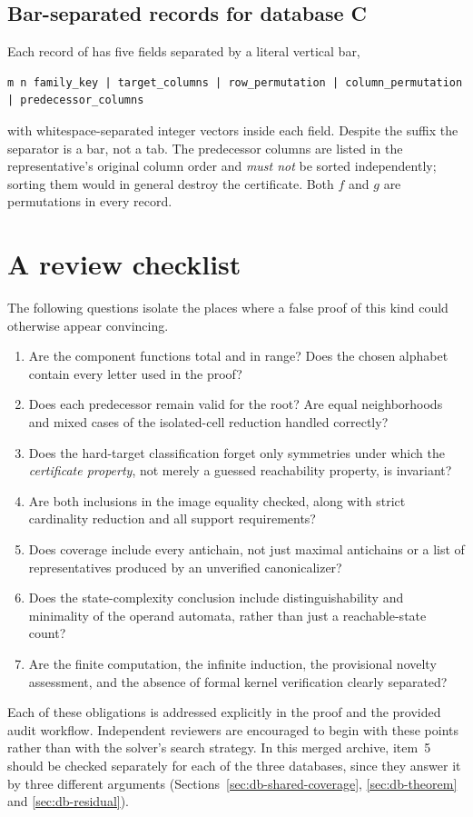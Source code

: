 \documentclass[11pt,letterpaper]{article}
\numberwithin{equation}{section}
\theoremstyle{definition}
\theoremstyle{remark}
\newcommand{\code}[1]{\texttt{\detokenize{#1}}}
\newcommand{\dbC}{\textsf{C}}
\begin{document}
\subsection{Bar-separated records for database \dbC{}}
Each record of  has five fields separated by
a literal vertical bar,
\begin{lstlisting}
m n family_key | target_columns | row_permutation | column_permutation | predecessor_columns
\end{lstlisting}
with whitespace-separated integer vectors inside each field. Despite the
\code{.tsv} suffix the separator is a bar, not a tab. The predecessor columns
are listed in the representative's original column order and
\emph{must not} be sorted independently; sorting them would in general
destroy the certificate. Both $f$ and $g$ are permutations in every record.

\section{A review checklist}
The following questions isolate the places where a false proof of this
kind could otherwise appear convincing.
{
\begin{enumerate}[label=\arabic*.]
\item Are the component functions total and in range? Does the chosen alphabet
contain every letter used in the proof?
\item Does each predecessor remain valid for the root? Are equal neighborhoods
and mixed cases of the isolated-cell reduction handled correctly?
\item Does the hard-target classification forget only symmetries under
which the \emph{certificate property}, not merely a guessed reachability
property, is invariant?
\item Are both inclusions in the image equality checked, along with strict
cardinality reduction and all support requirements?
\item Does coverage include every antichain, not just maximal antichains
or a list of representatives produced by an unverified canonicalizer?
\item Does the state-complexity conclusion include distinguishability and
minimality of the operand automata, rather than just a reachable-state count?
\item Are the finite computation, the infinite induction, the provisional
novelty assessment, and the absence of formal kernel verification clearly
separated?
\end{enumerate}}
Each of these obligations is addressed explicitly in the proof and the
provided audit workflow. Independent reviewers are encouraged to begin
with these points rather than with the solver's search strategy. In this
merged archive, item~5 should be checked separately for each of the three
databases, since they answer it by three different arguments
(Sections~\ref{sec:db-shared-coverage}, \ref{sec:db-theorem} and
\ref{sec:db-residual}).
\end{document}
